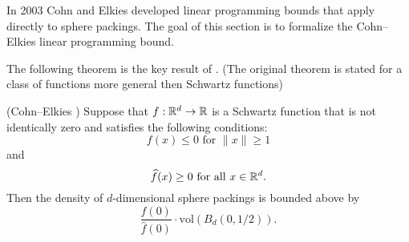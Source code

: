 In 2003 Cohn and Elkies \cite{ElkiesCohn}  developed  linear programming bounds that apply directly to sphere packings. The goal of this section is to formalize the Cohn--Elkies linear programming bound.

The following theorem is the key result of \cite{ElkiesCohn}. (The original theorem is stated for a   class of functions more general then Schwartz functions)
\begin{theorem}\label{thm:Cohn-Elkies}\notready
(Cohn--Elkies \cite{ElkiesCohn}) Suppose that  $f:\mathbb{R}^d\to\mathbb{R}$ is a Schwartz function that is not identically zero and satisfies the following conditions:
\begin{equation}\label{eqn:Cohn-Elkies-condition-1}f(x)\leq 0\mbox{ for } \|x\|\geq 1\end{equation} and
\begin{equation}\label{eqn:Cohn-Elkies-condition-2}\widehat{f}(x)\geq0\mbox{ for all } x\in\mathbb{R}^d.\end{equation}
  Then the density of $d$-dimensional
  sphere packings is bounded above by $$\frac{f(0)}{\widehat{f}(0)}\cdot \mathrm{vol}(B_d(0,1/2)).$$
\end{theorem}
